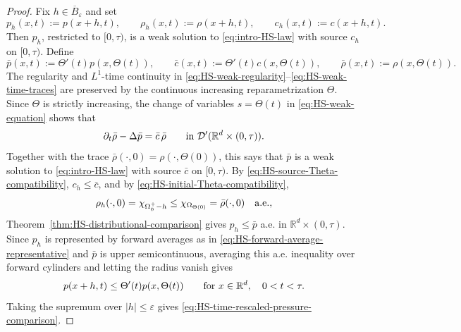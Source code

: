 \documentclass[11pt]{amsart}
\numberwithin{equation}{section}
\numberwithin{figure}{section}
\theoremstyle{plain}
\theoremstyle{definition}
\theoremstyle{remark}
\theoremstyle{plain}
\newcommand{\abs}[1]{\lvert #1 \rvert}
\newcommand{\vep}{\varepsilon}
\def\R{\mathbb{R}}
\begin{document}
\begin{proof}
Fix \(h\in\overline B_\vep\) and set
\[
    p_h(x,t):=p(x+h,t),
    \qquad
    \rho_h(x,t):=\rho(x+h,t),
    \qquad
    c_h(x,t):=c(x+h,t).
\]
Then \(p_h\), restricted to \([0,\tau)\), is a weak solution to
\eqref{eq:intro-HS-law} with source \(c_h\) on \([0,\tau)\).  Define
\begin{equation}\label{eq:HS-bar-p-time-rescale}
    \bar p(x,t):=\Theta'(t)p(x,\Theta(t)),
    \qquad
    \bar c(x,t):=\Theta'(t)c(x,\Theta(t)),
    \qquad
    \bar\rho(x,t):=\rho(x,\Theta(t)).
\end{equation}
  The regularity and \(L^1\)-time continuity in
\eqref{eq:HS-weak-regularity}--\eqref{eq:HS-weak-time-traces} are preserved by
the continuous increasing reparametrization \(\Theta\).  Since \(\Theta\) is
strictly increasing, the change of variables \(s=\Theta(t)\) in
\eqref{eq:HS-weak-equation} shows that
\begin{equation}\label{eq:HS-bar-p-weak-equation}
    \partial_t\bar\rho-\Delta\bar p=\bar c\,\bar\rho
    \qquad\hbox{in }\mathcal D'(\R^d\times(0,\tau)).
\end{equation}
Together with the trace \(\bar\rho(\cdot,0)=\rho(\cdot,\Theta(0))\), this says
that \(\bar p\) is a weak solution
to \eqref{eq:intro-HS-law} with source \(\bar c\) on \([0,\tau)\).  By
\eqref{eq:HS-source-Theta-compatibility}, \(c_h\leq\bar c\), and by
\eqref{eq:HS-initial-Theta-compatibility},
\[
    \rho_h(\cdot,0)
    =\chi_{\Omega_0^{+}-h}\leq\chi_{\Omega_{\Theta(0)}}
    =\bar\rho(\cdot,0)\quad\hbox{a.e.},
\]
Theorem~\ref{thm:HS-distributional-comparison} gives \(p_h\leq\bar p\) a.e. in
\(\R^d\times(0,\tau)\).  Since \(p_h\) is represented by forward averages as in
\eqref{eq:HS-forward-average-representative} and \(\bar p\) is upper
semicontinuous, averaging this a.e. inequality over forward cylinders and
letting the radius vanish gives
\[
    p(x+h,t)\leq\Theta'(t)p(x,\Theta(t))
    \qquad\hbox{for }x\in\R^d,\quad 0<t<\tau .
\]
Taking the supremum over \(\abs{h}\leq\vep\) gives
\eqref{eq:HS-time-rescaled-pressure-comparison}.
\end{proof}
\end{document}
